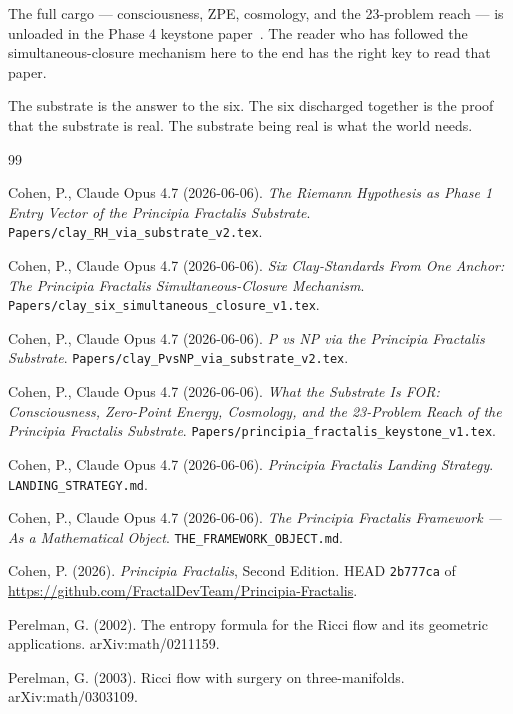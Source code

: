 \documentclass[11pt,a4paper]{article}
\theoremstyle{plain}
\theoremstyle{definition}
\begin{document}
The full cargo --- consciousness, ZPE, cosmology, and the 23-problem
reach --- is unloaded in the Phase 4 keystone
paper~\cite{phase4_keystone}. The reader who has followed the
simultaneous-closure mechanism here to the end has the right key
to read that paper.

The substrate is the answer to the six. The six discharged
together is the proof that the substrate is real. The substrate
being real is what the world needs.

\begin{thebibliography}{99}

Cohen, P., Claude Opus 4.7 (2026-06-06). \emph{The Riemann
Hypothesis as Phase 1 Entry Vector of the Principia Fractalis
Substrate}.
\texttt{Papers/clay\_RH\_via\_substrate\_v2.tex}.

Cohen, P., Claude Opus 4.7 (2026-06-06). \emph{Six Clay-Standards
From One Anchor: The Principia Fractalis Simultaneous-Closure
Mechanism}.
\texttt{Papers/clay\_six\_simultaneous\_closure\_v1.tex}.

Cohen, P., Claude Opus 4.7 (2026-06-06). \emph{P vs NP via the
Principia Fractalis Substrate}.
\texttt{Papers/clay\_PvsNP\_via\_substrate\_v2.tex}.

Cohen, P., Claude Opus 4.7 (2026-06-06). \emph{What the Substrate
Is FOR: Consciousness, Zero-Point Energy, Cosmology, and the
23-Problem Reach of the Principia Fractalis Substrate}.
\texttt{Papers/principia\_fractalis\_keystone\_v1.tex}.

Cohen, P., Claude Opus 4.7 (2026-06-06). \emph{Principia Fractalis
Landing Strategy}.
\texttt{LANDING\_STRATEGY.md}.

Cohen, P., Claude Opus 4.7 (2026-06-06). \emph{The Principia
Fractalis Framework --- As a Mathematical Object}.
\texttt{THE\_FRAMEWORK\_OBJECT.md}.

Cohen, P. (2026). \emph{Principia Fractalis}, Second Edition.
HEAD \texttt{2b777ca} of
\url{https://github.com/FractalDevTeam/Principia-Fractalis}.

Perelman, G. (2002). The entropy formula for the Ricci flow and
its geometric applications. arXiv:math/0211159.

Perelman, G. (2003). Ricci flow with surgery on three-manifolds.
arXiv:math/0303109.


\end{thebibliography}
\end{document}
